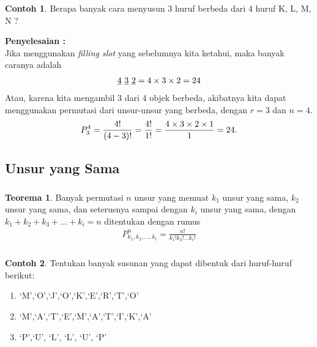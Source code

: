 \documentclass[aspectratio=169]{beamer}
\theoremstyle{definition}
\newtheorem{teorema}{Teorema}
\newtheorem{contoh}{Contoh}
\begin{document}
\begin{frame}
  \frametitle{\insertsection}
  \begin{contoh}
    Berapa banyak cara menyusun 3 huruf berbeda dari 4 huruf K, L, M, N ?
  \end{contoh}
  \textbf{Penyelesaian : }\\
  Jika menggunakan \textit{filling slot} yang sebelumnya kita ketahui, maka banyak caranya adalah 
  \begin{align}
       \uline{4} \ \uline{3} \  \uline{2} = 4 \times 3 \times 2 = 24 \notag
  \end{align}
  Atau, karena kita mengambil 3 dari 4 objek berbeda, akibatnya kita dapat menggunakan permutasi dari unsur-unsur yang berbeda, dengan $r=3$ dan $n=4$.
  \begin{align}
      P_3^4 = \frac{4!}{(4-3)!}=\frac{4!}{1!}=\frac{4 \times 3 \times 2 \times 1}{1}=24. \notag
  \end{align}
\end{frame}

\subsection{Unsur yang Sama}
\begin{frame}
  \frametitle{\insertsection}
  \framesubtitle{\insertsubsection}
  \begin{teorema}
    Banyak permutasi $n$ unsur yang memuat $k_1$ unsur yang sama, $k_2$ unsur yang sama, dan seterusnya sampai dengan $k_i$ unsur yang sama, dengan $k_1+k_2+k_3+...+k_i=n$ ditentukan dengan rumus
\begin{align}
    P^n_{k_1,k_2,\dots,k_i}=\frac{n!}{k_1!k_2!...k_i!}
\end{align}
  \end{teorema}
\end{frame}

\begin{frame}
  \frametitle{\insertsection}
  \framesubtitle{\insertsubsection}
  \begin{contoh}
    Tentukan banyak susunan yang dapat dibentuk dari huruf-huruf berikut:
    \begin{enumerate}
      \item `M',`O',`J',`O',`K',`E',`R',`T',`O'
      \item `M',`A',`T',`E',`M',`A',`T',`I',`K',`A'
      \item `P',`U', `L', `L', `U', `P'
    \end{enumerate}
  \end{contoh}
\end{frame}
\end{document}
